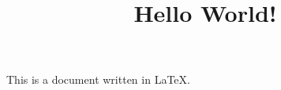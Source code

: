 \documentclass[10pt]{article}
\title{Hello World!}
\begin{document}
\maketitle

This is a document written in \LaTeX.
\end{document}

